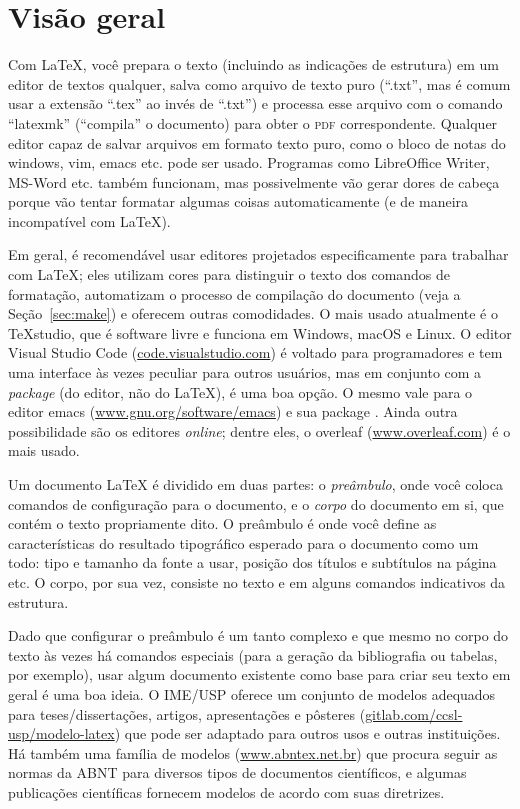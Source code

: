 \section{Visão geral}

Com \LaTeX{}, você prepara o texto (incluindo as indicações de estrutura) em
um editor de textos qualquer, salva como arquivo de texto puro (``.txt'',
mas é comum usar a extensão ``.tex'' ao invés de ``.txt'') e processa esse
arquivo com o comando ``latexmk'' (``compila'' o documento) para obter o
\textsc{pdf} correspondente. Qualquer editor capaz de salvar arquivos em formato
texto puro, como o bloco de notas do windows, vim, emacs etc. pode ser usado.
Programas como LibreOffice Writer, MS-Word etc. também funcionam, mas
possivelmente vão gerar dores de cabeça porque vão tentar formatar algumas
coisas automaticamente (e de maneira incompatível com \LaTeX{}).

Em geral, é recomendável usar editores projetados especificamente para
trabalhar com \LaTeX{}; eles utilizam cores para distinguir o texto dos
comandos de formatação, automatizam o processo de compilação do documento
(veja a Seção~\ref{sec:make})
e oferecem outras comodidades. O mais usado atualmente é o \TeX{}studio,
que é software livre e funciona em Windows, macOS e Linux. O editor Visual
Studio Code (\url{code.visualstudio.com}) é voltado para programadores e
tem uma interface às vezes peculiar para outros usuários, mas em conjunto
com a \emph{package}  (do editor, não do \LaTeX), é uma
boa opção. O mesmo vale para o editor emacs (\url{www.gnu.org/software/emacs})
e sua package . Ainda outra possibilidade são os editores
\emph{online}; dentre eles, o overleaf (\url{www.overleaf.com}) é o mais usado.

Um documento \LaTeX{} é dividido em duas partes: o \emph{preâmbulo}, onde
você coloca comandos de configuração para o documento, e o \emph{corpo}
do documento em si, que contém o texto propriamente dito. O preâmbulo é
onde você define as características do resultado tipográfico esperado
para o documento como um todo: tipo e tamanho da fonte a usar, posição
dos títulos e subtítulos na página etc. O corpo, por sua vez, consiste no
texto e em alguns comandos indicativos da estrutura.

Dado que configurar o preâmbulo é um tanto complexo e que mesmo no corpo
do texto às vezes há comandos especiais (para a geração da bibliografia
ou tabelas, por exemplo),
usar algum documento existente como base para criar seu texto em geral é
uma boa ideia. O IME/USP oferece um conjunto de modelos adequados para
teses/dissertações, artigos, apresentações e pôsteres (\url{gitlab.com/ccsl-usp/modelo-latex})
que pode ser adaptado para outros usos e outras instituições. Há também uma
família de modelos (\url{www.abntex.net.br}) que procura seguir as normas
da ABNT para diversos tipos de documentos científicos, e algumas publicações
científicas fornecem modelos de acordo com suas diretrizes.

